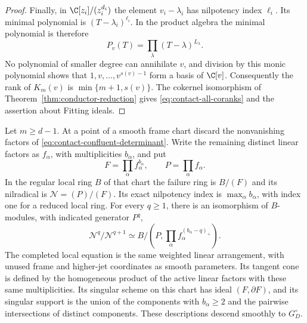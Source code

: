 \begin{proof}
Finally, in $\C[z_i]/(z_i^{d_i})$ the element $v_i-\lambda_i$
has nilpotency index $\ell_i$. Its minimal polynomial is
$(T-\lambda_i)^{\ell_i}$. In the product algebra the minimal
polynomial is therefore
\begin{equation}\label{eq:contact-minimal-polynomial}
 P_v(T)=\prod_\lambda(T-\lambda)^{L_\lambda}.
\end{equation}
No polynomial of smaller degree can annihilate $v$, and division by
this monic polynomial shows that $1,v,\ldots,v^{s(v)-1}$ form a
basis of $\C[v]$. Consequently the rank of $K_m(v)$ is
$\min\{m+1,s(v)\}$. The cokernel isomorphism of
Theorem~\ref{thm:conductor-reduction} gives
\eqref{eq:contact-all-coranks} and the assertion about Fitting ideals.
\end{proof}

\begin{theorem}
\label{thm:contact-layers}
Let $m\ge d-1$. At a point of a smooth frame chart discard the
nonvanishing factors of \eqref{eq:contact-confluent-determinant}.
Write the remaining distinct linear factors as $f_\alpha$, with
multiplicities $b_\alpha$, and put
\[
 F=\prod_\alpha f_\alpha^{b_\alpha},\qquad P=\prod_\alpha f_\alpha.
\]
In the regular local ring $B$ of that chart the failure ring is
$B/(F)$ and its nilradical is $\mathcal N=(P)/(F)$. Its exact
nilpotency index is $\max_\alpha b_\alpha$, with index one for a
reduced local ring. For every $q\ge1$, there is an isomorphism
of $B$-modules, with indicated generator $P^q$,
\begin{equation}\label{eq:contact-nilradical-layers}
 \mathcal N^q/\mathcal N^{q+1}
 \simeq
 B\big/\left(P,\prod_\alpha f_\alpha^{(b_\alpha-q)_+}\right).
\end{equation}
The completed local equation is the same weighted linear
arrangement, with unused frame and higher-jet coordinates as smooth
parameters. Its tangent cone is defined by the homogeneous product
of the active linear factors with these same multiplicities.
Its singular scheme on this chart has ideal
$(F,\partial F)$, and its singular support is the union of the
components with $b_\alpha\ge2$ and the pairwise intersections of
distinct components. These descriptions descend smoothly to
$G_D^\circ$.
\end{theorem}
